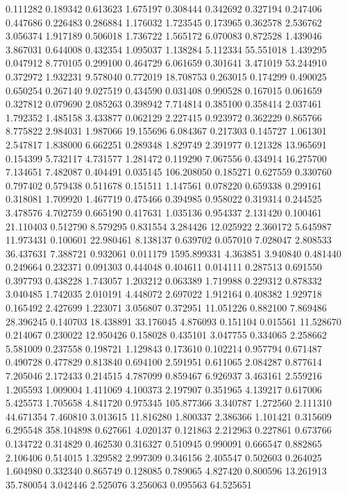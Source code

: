 0.111282
0.189342
0.613623
1.675197
0.308444
0.342692
0.327194
0.247406
0.447686
0.226483
0.286884
1.176032
1.723545
0.173965
0.362578
2.536762
3.056374
1.917189
0.506018
1.736722
1.565172
6.070083
0.872528
1.439046
3.867031
0.644008
0.432354
1.095037
1.138284
5.112334
55.551018
1.439295
0.047912
8.770105
0.299100
0.464729
6.061659
0.301641
3.471019
53.244910
0.372972
1.932231
9.578040
0.772019
18.708753
0.263015
0.174299
0.490025
0.650254
0.267140
9.027519
0.434590
0.031408
0.990528
0.167015
0.061659
0.327812
0.079690
2.085263
0.398942
7.714814
0.385100
0.358414
2.037461
1.792352
1.485158
3.433877
0.062129
2.227415
0.923972
0.362229
0.865766
8.775822
2.984031
1.987066
19.155696
6.084367
0.217303
0.145727
1.061301
2.547817
1.838000
6.662251
0.289348
1.829749
2.391977
0.121328
13.965691
0.154399
5.732117
4.731577
1.281472
0.119290
7.067556
0.434914
16.275700
7.134651
7.482087
0.404491
0.035145
106.208050
0.185271
0.627559
0.330760
0.797402
0.579438
0.511678
0.151511
1.147561
0.078220
0.659338
0.299161
0.318081
1.709920
1.467719
0.475466
0.394985
0.958022
0.319314
0.244525
3.478576
4.702759
0.665190
0.417631
1.035136
0.954337
2.131420
0.100461
21.110403
0.512790
8.579295
0.831554
3.284426
12.025922
2.360172
5.645987
11.973431
0.100601
22.980461
8.138137
0.639702
0.057010
7.028047
2.808533
36.437631
7.388721
0.932061
0.011179
1595.899331
4.363851
3.940840
0.481440
0.249664
0.232371
0.091303
0.444048
0.404611
0.014111
0.287513
0.691550
0.397793
0.438228
1.743057
1.203212
0.063389
1.719988
0.229312
0.878332
3.040485
1.742035
2.010191
4.448072
2.697022
1.912164
0.408382
1.929718
0.165492
2.427699
1.223071
3.056807
0.372951
11.051226
0.882100
7.869486
28.396245
0.140703
18.438891
33.176045
4.876093
0.151104
0.015561
11.528670
0.214067
0.230022
12.950426
0.158028
0.435101
3.047755
0.334065
2.258662
5.581009
0.237558
0.198721
1.129843
0.173610
0.102214
0.957794
0.671487
0.490728
0.477829
0.813840
0.694100
2.591951
0.611065
2.084287
0.877614
7.205046
2.172433
0.214515
4.787099
0.859467
6.926937
3.463161
2.559216
1.205593
1.009004
1.411069
4.100373
2.197907
0.351965
4.139217
0.617006
5.425573
1.705658
4.841720
0.975345
105.877366
3.340787
1.272560
2.111310
44.671354
7.460810
3.013615
11.816280
1.800337
2.386366
1.101421
0.315609
6.295548
358.104898
0.627661
4.020137
0.121863
2.212963
0.227861
0.673766
0.134722
0.314829
0.462530
0.316327
0.510945
0.990091
0.666547
0.882865
2.106406
0.514015
1.329582
2.997309
0.346156
2.405547
0.502603
0.264025
1.604980
0.332340
0.865749
0.128085
0.789065
4.827420
0.800596
13.261913
35.780054
3.042446
2.525076
3.256063
0.095563
64.525651
